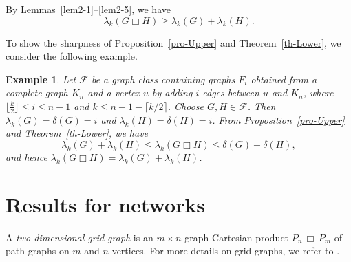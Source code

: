 \documentclass[final]{dmtcs-episciences}
\newtheorem{example}{Example}[section]
\begin{document}
By Lemmas~\ref{lem2-1}--\ref{lem2-5}, we have \[\lambda_k(G\Box H)\geq
\lambda_k(G)+\lambda_k(H).\]


To show the sharpness of Proposition~\ref{pro-Upper} and
Theorem~\ref{th-Lower}, we consider the following example.

\begin{example}
Let $\mathcal{F}$ be a graph class containing graphs $F_i$ obtained
from a complete graph $K_n$ and a vertex $u$ by adding $i$ edges
between $u$ and $K_n$, where $\lfloor\frac{k}{2}\rfloor\leq i\leq
n-1$ and $k\leq n-1-\lceil k/2\rceil$. Choose $G,H\in \mathcal{F}$.
Then $\lambda_k(G)=\delta(G)=i$ and $\lambda_k(H)=\delta(H)=i$. From
Proposition~\ref{pro-Upper} and Theorem~\ref{th-Lower}, we have
\[
\lambda_k(G)+\lambda_k(H)\leq \lambda_k(G\Box H)\leq
\delta(G)+\delta(H),
\]
and hence $\lambda_k(G\Box H)=\lambda_k(G)+\lambda_k(H)$.
\end{example}

\section{Results for networks}

A \emph{two-dimensional grid graph} is an $m\times n$ graph
Cartesian product $P_n\,\Box\,P_m$ of path graphs on $m$ and $n$
vertices. For more details on grid graphs, we refer to \cite{Calkin,
ItaiRodeh}.
\end{document}
